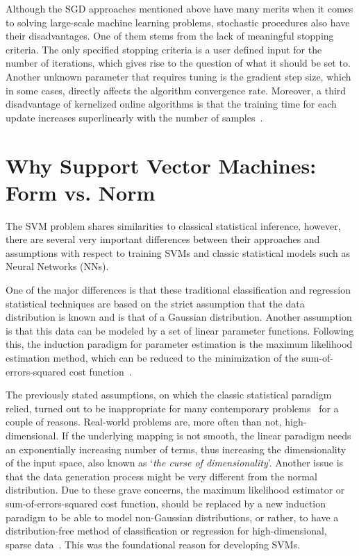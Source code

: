 \documentclass[reqno]{vcuthesis}
\numberwithin{equation}{chapter}
\begin{document}
Although the SGD approaches mentioned above have many merits when it comes to solving large-scale machine learning problems, stochastic procedures also have their disadvantages. One of them stems from the lack of meaningful stopping criteria. The only specified stopping criteria is a user defined input for the number of iterations, which gives rise to the question of what it should be set to. Another unknown parameter that requires tuning is the gradient step size, which in some cases, directly affects the algorithm convergence rate. Moreover, a third disadvantage of kernelized online algorithms is that the training time for each update increases superlinearly with the number of samples~\cite{bottou2004large}.

\section{Why Support Vector Machines: Form vs. Norm}
The SVM problem shares similarities to classical statistical inference, however, there are several very important differences between their approaches and assumptions with respect to training SVMs and classic statistical models such as Neural Networks (NNs). 

One of the major differences is that these traditional classification and regression statistical techniques are based on the strict assumption that the data distribution is known and is that of a Gaussian distribution. Another assumption is that this data can be modeled by a set of linear parameter functions. Following this, the induction paradigm for parameter estimation is the maximum likelihood estimation method, which can be reduced to the minimization of the sum-of-errors-squared cost function~\cite{Kecman2001}. 

The previously stated assumptions, on which the classic statistical paradigm relied, turned out to be inappropriate for many contemporary problems~\cite{vapnik1997support} for a couple of reasons. Real-world problems are, more often than not, high-dimensional. If the underlying mapping is not smooth, the linear paradigm needs an exponentially increasing number of terms, thus increasing the dimensionality of the input space, also known as `\textit{the curse of dimensionality}'. Another issue is that the data generation process might be very different from the normal distribution. Due to these grave concerns, the maximum likelihood estimator or sum-of-errors-squared cost function, should be replaced by a new induction paradigm to be able to model non-Gaussian distributions, or rather, to have a distribution-free method of classification or regression for high-dimensional, sparse data~\cite{Kecman2001}. This was the foundational reason for developing SVMs.
\end{document}
